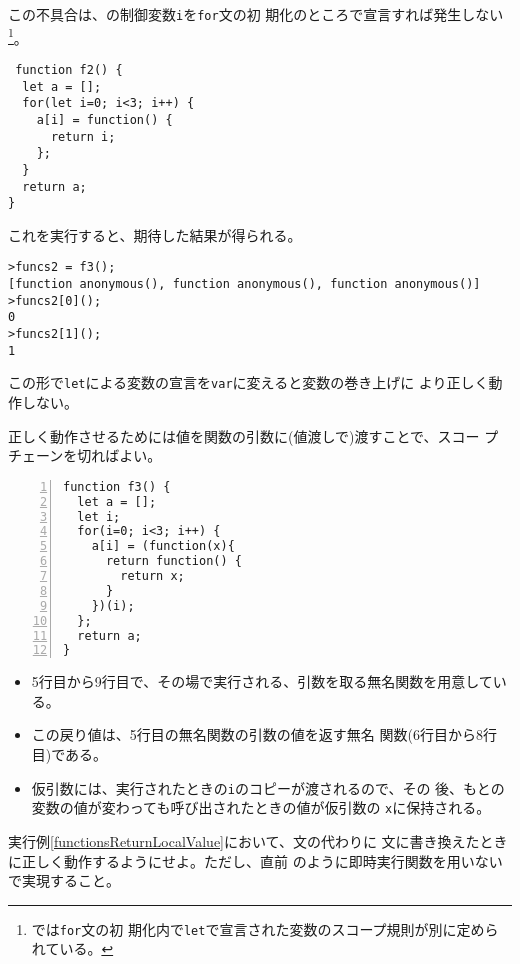 \begin{Exec}\upshape
この不具合は、の制御変数\Verb+i+を\Verb+for+文の初
 期化のところで宣言すれば発生しない\footnote{\ES では\texttt{for}文の初
 期化内で\texttt{let}で宣言された変数のスコープ規則が別に定められている。}。
\begin{Verbatim}
 function f2() {
  let a = [];
  for(let i=0; i<3; i++) {
    a[i] = function() {
      return i;
    };
  }
  return a;
}
\end{Verbatim}
これを実行すると、期待した結果が得られる。
\begin{Verbatim}
>funcs2 = f3();
[function anonymous(), function anonymous(), function anonymous()]
>funcs2[0]();
0
>funcs2[1]();
1
\end{Verbatim}

この形で\Verb+let+による変数の宣言を\Verb+var+に変えると変数の巻き上げに
 より正しく動作しない。
 
正しく動作させるためには値を関数の引数に(値渡しで)渡すことで、スコー
 プチェーンを切ればよい。
 \begin{Verbatim}[numbers=left]
function f3() {
  let a = [];
  let i;
  for(i=0; i<3; i++) {
    a[i] = (function(x){
      return function() {
        return x;
      }
    })(i);
  };
  return a;
}
 \end{Verbatim}
\begin{itemize}
 \item 5行目から9行目で、その場で実行される、引数を取る無名関数を用意している。
 \item この戻り値は、5行目の無名関数の引数の値を返す無名
       関数(6行目から8行目)である。
 \item 仮引数には、実行されたときの\Verb+i+のコピーが渡されるので、その
       後、もとの変数の値が変わっても呼び出されたときの値が仮引数の
       \texttt{x}に保持される。
\end{itemize}
\end{Exec}
\begin{Prob}\upshape
 実行例\ref{functionsReturnLocalValue}において、文の代わりに
 文に書き換えたときに正しく動作するようにせよ。ただし、直前
 のように即時実行関数を用いないで実現すること。
\end{Prob}
\iffalse
この書き方が有効になるのは関数をオブジェクトのコンストラクタとして使用し、
インスタンスに通し番号を付けるときなどに必要となる。
\begin{Prob}\upshape
次の関数のたいして\texttt{var a=f4();}とした後、\texttt{a[1](0);}などの
 値がどうなるか調べなさい。また、そのような結果になる理由を考えなさ
 い。
\begin{Verbatim}
function f4() {
  var a = [], b;
  var i;
  for(i=0; i<3; i++) {
    b=[i];
    a[i] = function() {
      return b;
    };
  }
  return a;
}
\end{Verbatim}

\end{Prob}
\fi